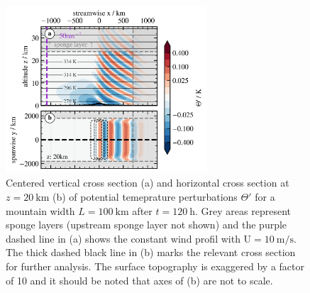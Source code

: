 \begin{figure}[t]
    \centering
    \includegraphics[width=0.67\textwidth]{figures_model/MWs-th-referenceSim.png}
    \caption{Centered vertical cross section (a) and horizontal cross section at $z=\SI{20}{\kilo\meter}$ (b) of potential temeprature perturbations $\Theta'$ for a mountain width $L=\SI{100}{\kilo\meter}$ after $t=\SI{120}{\hour}$. Grey areas represent sponge layers (upstream sponge layer not shown) and the purple dashed line in (a) shows the constant wind profil with U$=\SI{10}{\meter\per\second}$. The thick dashed black line in (b) marks the relevant cross section for further analysis. The surface topography is exaggered by a factor of 10 and it should be noted that axes of (b) are not to scale.}
    \label{fig:MWs-reference}
\end{figure}

